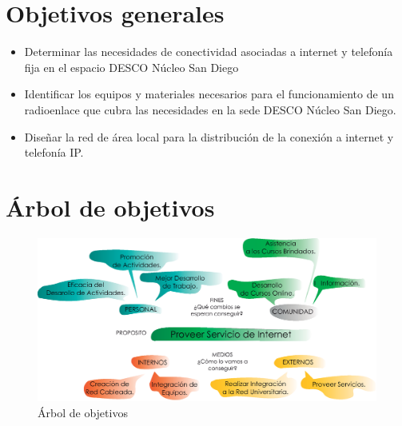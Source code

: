 \documentclass[11pt, a4paper, twosides]{report}
\begin{document}
\section{Objetivos generales}
\begin{itemize}
    \item Determinar las necesidades de conectividad asociadas a internet y telefonía fija en el espacio DESCO Núcleo San Diego
    \item Identificar los equipos y materiales necesarios para el funcionamiento de un radioenlace que cubra las necesidades en la sede DESCO Núcleo San Diego.
    \item Diseñar la red de área local para la distribución de la conexión a internet y telefonía IP.
\end{itemize}

\section{Árbol de objetivos}

\begin{figure}[H]
    \centering
    \includegraphics[width= 1 \linewidth]{ArbolDeObjetivos.eps}
    \caption{Árbol de objetivos}
    \label{fig:problem_tree}
\end{figure}

\end{document}

